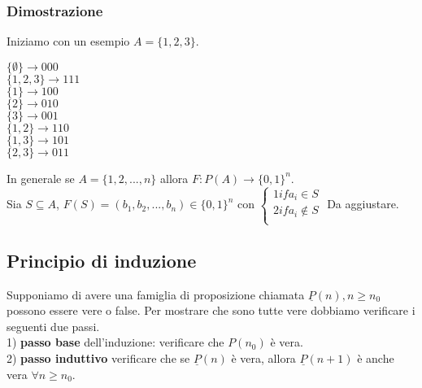 \documentclass[11pt]{article}
\begin{document}
            \subsubsection{Dimostrazione}
            Iniziamo con un esempio $A = \{1,2,3\}$.
            \begin{center}
            	$\{\emptyset\} \longrightarrow 000$ \\
            	$\{1,2,3\} \longrightarrow 111$\\
            	$\{1\} \longrightarrow 100$\\
            	$\{2\} \longrightarrow 010$\\
            	$\{3\} \longrightarrow 001$\\
            	$\{1,2\} \longrightarrow 110$\\
            	$\{1,3\} \longrightarrow 101$\\
            $\{2,3\} \longrightarrow 011$\\
            \end{center}
            In generale se $A = \{1,2,...,n\}$ allora $F:P(A) \to \{0,1\}^n$.\\
            Sia $S \subseteq A$, $F(S) = (b_1,b_2,...,b_n) \in \{0,1\}^n$ con $\begin{cases}
            1 if a_i \in S\\
            2 if a_i \not\in S\\
            \end{cases}$
            Da aggiustare.\\
            \subsection{Principio di induzione }
            Supponiamo di avere una famiglia di proposizione chiamata $\underline{P}(n), n \geq n_0$ possono essere vere o false. Per mostrare che sono tutte vere dobbiamo verificare i seguenti due passi.\\
            1) \textbf{passo base} dell'induzione: verificare che $P(n_0)$ \`e vera.\\
            2) \textbf{passo induttivo} verificare che se $\underline{P}(n)$ \`e vera, allora $\underline{P}(n+1)$ \`e anche vera $\forall n \geq n_0$.
\end{document}
